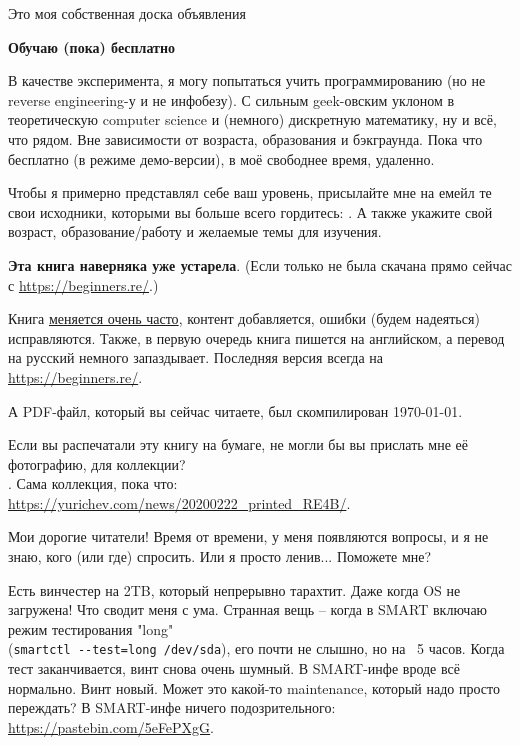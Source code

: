 
\begin{center}
\LARGE{} Это моя собственная доска объявления \normalsize{}
\end{center}

\textbf{Обучаю (пока) бесплатно}

В качестве эксперимента, я могу попытаться учить программированию (но не reverse engineering-у и не инфобезу). С сильным geek-овским уклоном в теоретическую computer science и (немного) дискретную математику, ну и всё, что рядом. Вне зависимости от возраста, образования и бэкграунда. Пока что бесплатно (в режиме демо-версии), в моё свободнее время, удаленно.

Чтобы я примерно представлял себе ваш уровень, присылайте мне на емейл те свои исходники, которыми вы больше всего гордитесь:
\EMAILS{}.
А также укажите свой возраст, образование/работу и желаемые темы для изучения.

\myhrule{}

\textbf{Эта книга наверняка уже устарела}.
(Если только не была скачана прямо сейчас с \url{https://beginners.re/}.)

Книга \href{\RepoURL/ChangeLog}{меняется очень часто},
контент добавляется, ошибки (будем надеяться) исправляются.
Также, в первую очередь книга пишется на английском, а перевод на русский немного запаздывает.
Последняя версия всегда на \url{https://beginners.re/}.

А PDF-файл, который вы сейчас читаете, был скомпилирован \today{}.

\myhrule{}

Если вы распечатали эту книгу на бумаге, не могли бы вы прислать мне её фотографию, для коллекции?\\
\EMAILS{}.
Сама коллекция, пока что: \url{https://yurichev.com/news/20200222_printed_RE4B/}.

\myhrule{}

Мои дорогие читатели! Время от времени, у меня появляются вопросы, и я не знаю, кого (или где) спросить.
Или я просто ленив...
Поможете мне?

\myhrule{}

Есть винчестер на 2TB, который непрерывно тарахтит.
Даже когда OS не загружена!
Что сводит меня с ума.
Странная вещь -- когда в SMART включаю режим тестирования "long" \\
(\verb|smartctl --test=long /dev/sda|),
его почти не слышно, но на ~5 часов.
Когда тест заканчивается, винт снова очень шумный.
В SMART-инфе вроде всё нормально.
Винт новый.
Может это какой-то maintenance, который надо просто переждать?
В SMART-инфе ничего подозрительного: \url{https://pastebin.com/5eFePXgG}.

